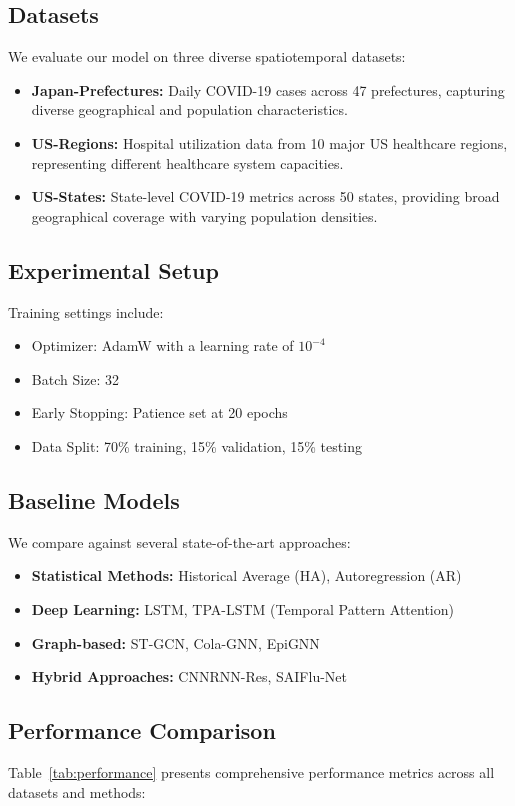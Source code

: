 \documentclass[lettersize, journal]{IEEEtran}
\begin{document}
\subsection{Datasets}
We evaluate our model on three diverse spatiotemporal datasets:

\begin{itemize}[leftmargin=*]
\item \textbf{Japan-Prefectures:} Daily COVID-19 cases across 47 prefectures, capturing diverse geographical and population characteristics.
\item \textbf{US-Regions:} Hospital utilization data from 10 major US healthcare regions, representing different healthcare system capacities.
\item \textbf{US-States:} State-level COVID-19 metrics across 50 states, providing broad geographical coverage with varying population densities.
\end{itemize}

\subsection{Experimental Setup}
Training settings include:
\begin{itemize}[leftmargin=*]
\item Optimizer: AdamW with a learning rate of $10^{-4}$
\item Batch Size: 32
\item Early Stopping: Patience set at 20 epochs
\item Data Split: 70\% training, 15\% validation, 15\% testing
\end{itemize}

\subsection{Baseline Models}
We compare against several state-of-the-art approaches:
\begin{itemize}[leftmargin=*]
\item \textbf{Statistical Methods:} Historical Average (HA), Autoregression (AR)
\item \textbf{Deep Learning:} LSTM, TPA-LSTM (Temporal Pattern Attention)
\item \textbf{Graph-based:} ST-GCN, Cola-GNN, EpiGNN
\item \textbf{Hybrid Approaches:} CNNRNN-Res, SAIFlu-Net
\end{itemize}

\subsection{Performance Comparison}
Table~\ref{tab:performance} presents comprehensive performance metrics across all datasets and methods:
\end{document}
